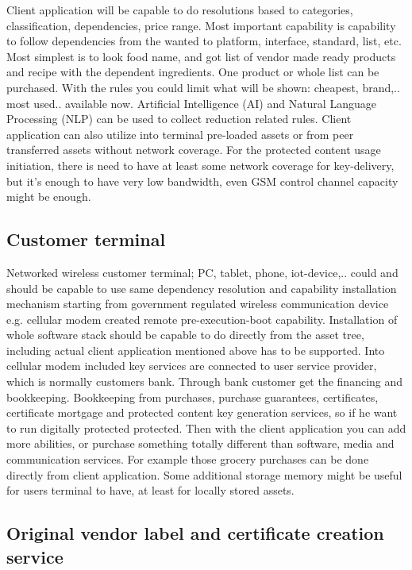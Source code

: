 Client application will be capable to do resolutions based to categories,
classification, dependencies, price range. Most important capability is
capability to follow dependencies from the wanted to platform, interface,
standard, list, etc. Most simplest is to look food name, and got list of
vendor made ready products and recipe with the dependent ingredients. One
product or whole list can be purchased. With the rules you could limit what
will be shown: cheapest, brand,.. most used.. available now. Artificial
Intelligence (AI) and Natural Language Processing (NLP) can be used to collect
reduction related rules. Client application can also utilize into terminal
pre-loaded assets or from peer transferred assets without network coverage.
For the protected content usage initiation, there is need to have at least
some network coverage for key-delivery, but it's enough to have very low
bandwidth, even GSM control channel capacity might be enough.

\subsection{Customer terminal}
\label{customer_terminal}

Networked wireless customer terminal; PC, tablet, phone, iot-device,.. could
and should be capable to use same dependency resolution and capability
installation mechanism starting from government regulated wireless
communication device e.g. cellular modem created remote pre-execution-boot
capability. Installation of whole software stack should be capable to do
directly from the asset tree, including actual client application mentioned
above has to be supported. Into cellular modem included key services are
connected to user service provider, which is normally customers bank. Through
bank customer get the financing and bookkeeping. Bookkeeping from purchases,
purchase guarantees, certificates, certificate mortgage and protected content
key generation services, so if he want to run digitally protected protected.
Then with the client application you can add more abilities, or purchase
something totally different than software, media and communication services. 
For example those grocery purchases can be done directly from client
application. Some additional storage memory might be useful for users terminal
to have, at least for locally stored assets.

\subsection{Original vendor label and certificate creation service}
\label{label_and_certificate_service}

